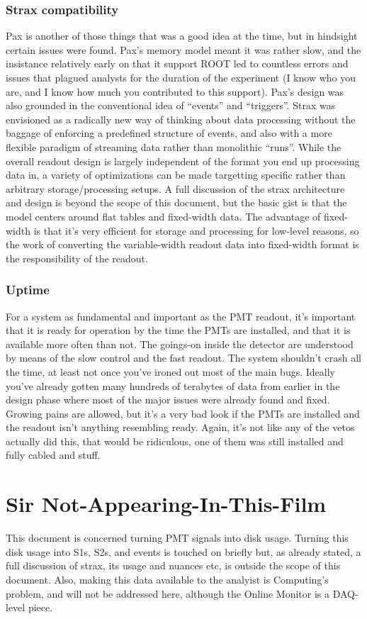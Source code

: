 \subsubsection{Strax compatibility}

Pax is another of those things that was a good idea at the time, but in hindsight certain issues were found.
Pax's memory model meant it was rather slow, and the insistance relatively early on that it support ROOT led to countless errors and issues that plagued analysts for the duration of the experiment (I know who you are, and I know how much you contributed to this support).
Pax's design was also grounded in the conventional idea of ``events'' and ``triggers''.
Strax was envisioned as a radically new way of thinking about data processing without the baggage of enforcing a predefined structure of events, and also with a more flexible paradigm of streaming data rather than monolithic ``runs''.
While the overall readout design is largely independent of the format you end up processing data in, a variety of optimizations can be made targetting specific rather than arbitrary storage/processing setups.
A full discussion of the strax architecture and design is beyond the scope of this document, but the basic gist is that the model centers around flat tables and fixed-width data.
The advantage of fixed-width is that it's very efficient for storage and processing for low-level reasons, so the work of converting the variable-width readout data into fixed-width format is the responsibility of the readout.

\subsubsection{Uptime}

For a system as fundamental and important as the PMT readout, it's important that it is ready for operation by the time the PMTs are installed, and that it is available more often than not.
The goings-on inside the detector are understood by means of the slow control and the fast readout.
The system shouldn't crash all the time, at least not once you've ironed out most of the main bugs.
Ideally you've already gotten many hundreds of terabytes of data from earlier in the design phase where most of the major issues were already found and fixed.
Growing pains are allowed, but it's a very bad look if the PMTs are installed and the readout isn't anything resembling ready.
Again, it's not like any of the vetos actually did this, that would be ridiculous, one of them was still installed and fully cabled and stuff.

\section{Sir Not-Appearing-In-This-Film}

This document is concerned turning PMT signals into disk usage.
Turning this disk usage into S1s, S2s, and events is touched on briefly but, as already stated, a full discussion of strax, its usage and nuances etc, is outside the scope of this document.
Also, making this data available to the analyist is Computing's problem, and will not be addressed here, although the Online Monitor is a DAQ-level piece.

